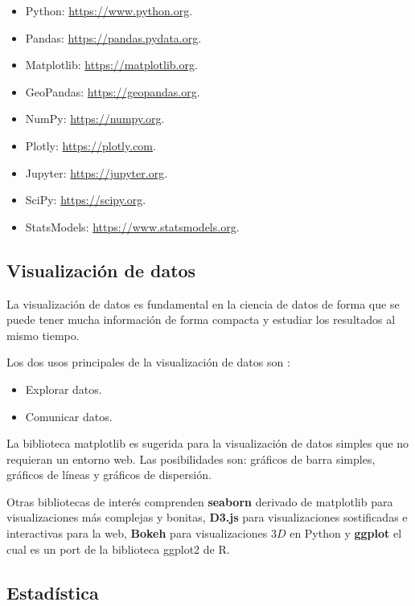 \documentclass{report}
\begin{document}
\begin{itemize}
    \item Python: \url{https://www.python.org}.
    \item Pandas: \url{https://pandas.pydata.org}.
    \item Matplotlib: \url{https://matplotlib.org}.
    \item GeoPandas: \url{https://geopandas.org}.
    \item NumPy: \url{https://numpy.org}.
    \item Plotly: \url{https://plotly.com}.
    \item Jupyter: \url{https://jupyter.org}.
    \item SciPy: \url{https://scipy.org}.
    \item StatsModels: \url{https://www.statsmodels.org}.
\end{itemize}

\subsection{Visualización de datos}

La visualización de datos es fundamental en la ciencia de datos de forma que se puede tener mucha información de forma compacta y estudiar los resultados al mismo tiempo.

\bigbreak

Los dos usos principales de la visualización de datos son \cite{grus-2015}:

\begin{itemize}
    \item Explorar datos.
    \item Comunicar datos.
\end{itemize}

La biblioteca matplotlib es sugerida \cite{grus-2015} para la visualización de datos simples que no requieran un entorno web. Las posibilidades son: gráficos de barra simples, gráficos de líneas y gráficos de dispersión.

\bigbreak

Otras bibliotecas de interés comprenden \textbf{seaborn} derivado de matplotlib para visualizaciones más complejas y bonitas, \textbf{D3.js} para visualizaciones sostificadas e interactivas para la web, \textbf{Bokeh} para visualizaciones $3D$ en Python y \textbf{ggplot} el cual es un port de la biblioteca ggplot2 de R. 

\subsection{Estadística}
\end{document}
